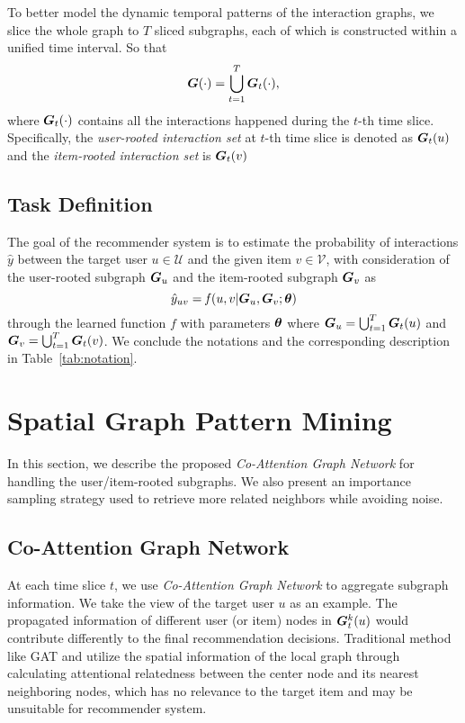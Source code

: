 To better model the dynamic temporal patterns of the interaction graphs, we slice the whole graph to $T$ sliced subgraphs, each of which is constructed within a unified time interval. So that
\begin{equation}
\begin{aligned}
	\bm{G}(\cdot) &= \bigcup_{t=1}^T \bm{G}_t(\cdot), \\
\end{aligned}
\end{equation}
where $\bm{G}_t(\cdot)$ contains all the interactions happened during the $t$-th time slice.
Specifically, the \textit{user-rooted interaction set} at $t$-th time slice is denoted as $\bm{G}_t(u)$ and the \textit {item-rooted interaction set} is $\bm{G}_t(v)$

\subsection{Task Definition}
The goal of the recommender system is to estimate the probability of interactions $\hat{y}$ between the target user $u \in \mathcal{U}$ and the given item $v \in \mathcal{V}$, with consideration of the user-rooted subgraph $\bm{G}_u$ and the item-rooted subgraph $\bm{G}_v$ as
\begin{equation}
\hat{y}_{uv} = \mathit{f}(u, v| \bm{G}_u, \bm{G}_v; \boldsymbol{\theta})
\end{equation}
through the learned function $\mathit{f}$ with parameters $\boldsymbol{\theta}$ where $\bm{G}_u = \bigcup_{t=1}^T \bm{G}_t(u)$ and $\bm{G}_v=\bigcup_{t=1}^T \bm{G}_t(v)$.
We conclude the notations and the corresponding description in Table~\ref{tab:notation}.



\section{Spatial Graph Pattern Mining}\label{sec:spatial}
In this section, we describe the proposed \textit{Co-Attention Graph Network} for handling the user/item-rooted subgraphs. We also present an importance sampling strategy used to retrieve more related neighbors while avoiding noise.


\subsection{Co-Attention Graph Network}
At each time slice $t$, we use \textit{Co-Attention Graph Network} to aggregate subgraph information. We take the view of the target user $u$ as an example.
The propagated information of different user (or item) nodes in $\bm{G}^k_t(u)$ would contribute differently to the final recommendation decisions.
Traditional method like GAT \cite{velivckovic2017graph} and \cite{song2019session} utilize the spatial information of the local graph through calculating attentional relatedness between the center node and its nearest neighboring nodes, which has no relevance to the target item and may be unsuitable for recommender system.

